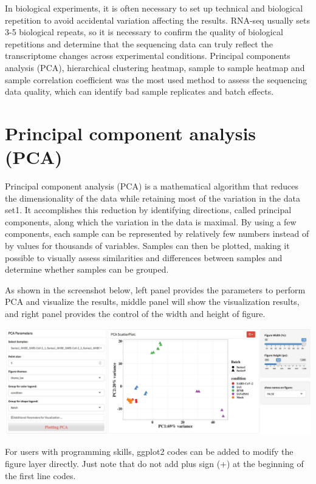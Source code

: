 \documentclass[
  a4paper,
  oneside]{book}
\begin{document}
In biological experiments, it is often necessary to set up technical and biological repetition to avoid accidental variation affecting the results. RNA-seq usually sets 3-5 biological repeats, so it is necessary to confirm the quality of biological repetitions and determine that the sequencing data can truly reflect the transcriptome changes across experimental conditions. Principal components analysis (PCA), hierarchical clustering heatmap, sample to sample heatmap and sample correlation coefficient was the most used method to assess the sequencing data quality, which can identify bad sample replicates and batch effects.

\hypertarget{principal-component-analysis-pca}{%
\section{Principal component analysis (PCA)}\label{principal-component-analysis-pca}}

Principal component analysis (PCA) is a mathematical algorithm that reduces the dimensionality of the data while retaining most of the variation in the data set1. It accomplishes this reduction by identifying directions, called principal components, along which the variation in the data is maximal. By using a few components, each sample can be represented by relatively few numbers instead of by values for thousands of variables. Samples can then be plotted, making it possible to visually assess similarities and differences between samples and determine whether samples can be grouped.

As shown in the screenshot below, left panel provides the parameters to perform PCA and visualize the results, middle panel will show the visualization results, and right panel provides the control of the width and height of figure.

\includegraphics{images/quality_pca.jpeg}

For users with programming skills, ggplot2 codes can be added to modify the figure layer directly. Just note that do not add plus sign (+) at the beginning of the first line codes.
\end{document}
